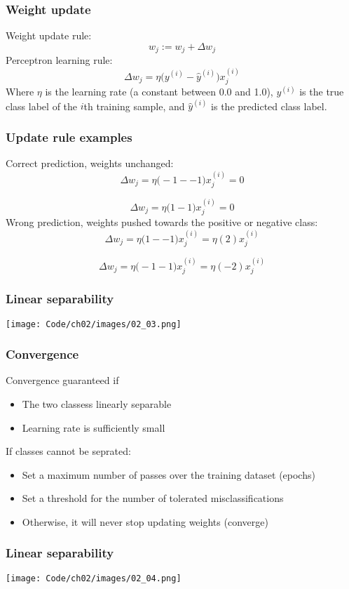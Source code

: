 \documentclass{beamer}
\begin{document}
\begin{frame}
  \frametitle{Weight update}
  Weight update rule:
  \[
  w_j := w_j + \Delta w_j
  \]
  Perceptron learning rule:
  \[
  \Delta w_j = \eta \bigg( y^{(i)} - \hat{y}^{(i)} \bigg)x_{j}^{(i)}
  \]
  Where $\eta$ is the learning rate (a constant between 0.0 and 1.0), $y^{(i)}$ is the true class label of the $i$th training sample, and $\hat{y}^{(i)}$ is the predicted class label. 
\end{frame}

\begin{frame}
  \frametitle{Update rule examples}
  Correct prediction, weights unchanged:
  \[
  \Delta w_j = \eta \bigg( -1 -- 1 \bigg)x_{j}^{(i)} = 0
  \]

  \[
  \Delta w_j = \eta \bigg( 1-1 \bigg)x_{j}^{(i)} = 0
  \]
  Wrong prediction, weights pushed towards the positive or negative class:
  \[
  \Delta w_j = \eta \bigg( 1 -- 1 \bigg)x_{j}^{(i)} = \eta(2)x_{j}^{(i)}
  \]
  
  \[
  \Delta w_j = \eta \bigg( -1-1 \bigg)x_{j}^{(i)} = \eta(-2)x_{j}^{(i)}
  \]
\end{frame}

\begin{frame}
  \frametitle{Linear separability}
  \texttt{[image: Code/ch02/images/02\_03.png]}
\end{frame}

\begin{frame}
  \frametitle{Convergence}
  Convergence guaranteed if
  \begin{itemize}
  \item The two classess linearly separable
  \item Learning rate is sufficiently small
  \end{itemize}
  If classes cannot be seprated:
  \begin{itemize}
  \item Set a maximum number of passes over the training dataset (epochs)
  \item Set a threshold for the number of tolerated misclassifications
  \item Otherwise, it will never stop updating weights (converge)
  \end{itemize}
\end{frame}

\begin{frame}
  \frametitle{Linear separability}
  \texttt{[image: Code/ch02/images/02\_04.png]}
\end{frame}
\end{document}
